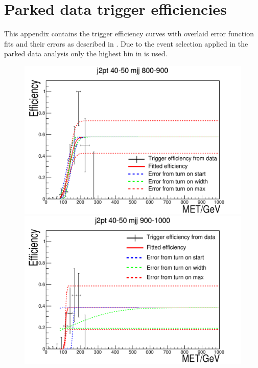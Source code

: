 \chapter{Parked data trigger efficiencies}
\label{app:trigeffs}
This appendix contains the trigger efficiency curves with overlaid error function fits and their errors as described in . Due to the event selection applied in the parked data analysis only the highest bin in \Mjj is used.

\begin{figure}[h!]
  \begin{center}
    \includegraphics[width=.6\largefigwidth]{plots/parked/trigfitplots/hData_MET_1D_23A.pdf}
    \includegraphics[width=.6\largefigwidth]{plots/parked/trigfitplots/hData_MET_1D_24A.pdf}


\end{center}
\end{figure}
